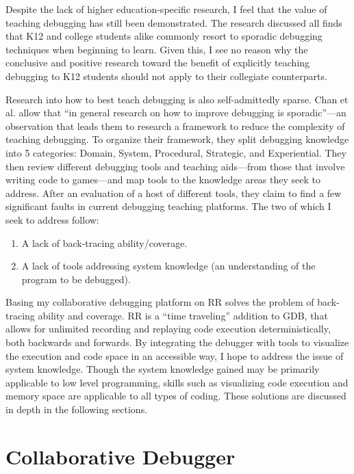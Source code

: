 \documentclass[12pt]{article}
\begin{document}
Despite the lack of higher education-specific research, I feel that
the value of teaching debugging has still been demonstrated.  The
research discussed all finds that K12 and college students alike
commonly resort to sporadic debugging techniques when beginning to
learn.  Given this, I see no reason why the conclusive and positive
research toward the benefit of explicitly teaching debugging to K12
students should not apply to their collegiate counterparts.\par

Research into how to best teach debugging is also self-admittedly
sparse.  Chan et al. allow that ``in general research on how to
improve debugging is sporadic''---an observation that leads them to
research a framework to reduce the complexity of teaching
debugging\cite{10.1145/3286960.3286970}.  To organize their framework,
they split debugging knowledge into 5 categories: Domain, System,
Procedural, Strategic, and Experiential.  They then review different
debugging tools and teaching aids---from those that involve writing
code to games---and map tools to the knowledge areas they seek to
address.  After an evaluation of a host of different tools, they claim
to find a few significant faults in current debugging teaching
platforms.  The two of which I seek to address follow:

\begin{enumerate}
\item A lack of back-tracing ability/coverage.
\item A lack of tools addressing system knowledge (an understanding of
  the program to be debugged).
\end{enumerate}

Basing my collaborative debugging platform on RR solves the problem of
back-tracing ability and coverage.  RR is a ``time traveling''
addition to GDB, that allows for unlimited recording and replaying
code execution deterministically, both backwards and
forwards\cite{DBLP:journals/corr/OCallahanJFHNP17}.  By integrating
the debugger with tools to visualize the execution and code space in
an accessible way, I hope to address the issue of system knowledge.
Though the system knowledge gained may be primarily applicable to low
level programming, skills such as visualizing code execution and
memory space are applicable to all types of coding.  These solutions
are discussed in depth in the following sections.

\section{Collaborative Debugger}
\end{document}
